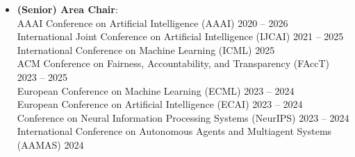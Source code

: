 \documentclass[localFont,alternative]{documentMETADATA}
\begin{document}
\begin{itemize}
    \item {\bf (Senior) Area Chair}: \\
    AAAI Conference on Artificial Intelligence (AAAI) \hfill {2020 -- 2026}\\
    International Joint Conference on Artificial Intelligence (IJCAI) \hfill {2021 -- 2025}\\
    International Conference on Machine Learning (ICML) \hfill {2025}\\
    ACM Conference on Fairness, Accountability, and Transparency (FAccT) \hfill {2023 -- 2025}\\
    European Conference on Machine Learning (ECML) \hfill{2023 -- 2024}\\
  	European Conference on Artificial Intelligence (ECAI) \hfill {2023 -- 2024}\\
  	Conference on Neural Information Processing Systems (NeurIPS)
  	\hfill {2023 -- 2024} \\
    International Conference on Autonomous Agents and Multiagent Systems (AAMAS) \hfill{2024}
  \end{itemize}
\end{document}

